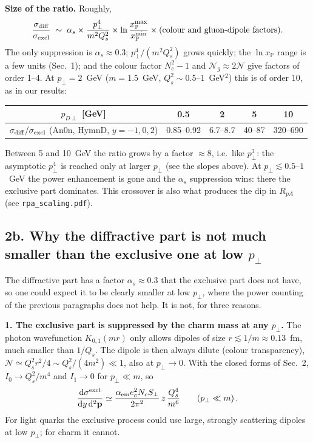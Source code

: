 \documentclass[12pt]{article}
\newcommand{\xpo}{x_{\mathbb{P}}}
\begin{document}
\textbf{Size of the ratio.} Roughly,
\[
  \frac{\sigma_{\rm diff}}{\sigma_{\rm excl}}\;\sim\;\alpha_s\times\frac{p_\perp^4}{m^2Q_s^2}
  \times\ln\frac{\xpo^{\max}}{\xpo^{\min}}\times(\text{colour and gluon-dipole factors}).
\]
The only suppression is $\alpha_s\approx0.3$; $p_\perp^4/(m^2Q_s^2)$ grows quickly; the $\ln\xpo$
range is a few units (Sec.~1); and the colour factor $N_c^2-1$ and $\mathcal{N}_g\approx2\mathcal{N}$
give factors of order 1--4. At $p_\perp=2$~GeV ($m=1.5$~GeV, $Q_s^2\sim0.5$--$1$~GeV$^2$) this is of
order 10, as in our results:
\begin{center}
\begin{tabular}{ccccc}
\toprule
$p_{D\perp}$ [GeV] & 0.5 & 2 & 5 & 10 \\
\midrule
$\sigma_{\rm diff}/\sigma_{\rm excl}$ (An0n, HymnD, $y=-1,0,2$) & 0.85--0.92 & 6.7--8.7 & 40--87 & 320--690 \\
\bottomrule
\end{tabular}
\end{center}
Between 5 and 10~GeV the ratio grows by a factor $\approx8$, i.e.\ like $p_\perp^{3}$: the asymptotic
$p_\perp^4$ is reached only at larger $p_\perp$ (see the slopes above). At $p_\perp\lesssim0.5$--$1$~GeV
the power enhancement is gone and the $\alpha_s$ suppression wins: there the exclusive part
dominates. This crossover is also what produces the dip in $R_{pA}$ (see \texttt{rpa\_scaling.pdf}).

\subsection*{2b. Why the diffractive part is not much smaller than the exclusive one at low $p_\perp$}

The diffractive part has a factor $\alpha_s\approx0.3$ that the exclusive part does not have, so one
could expect it to be clearly smaller at low $p_\perp$, where the power counting of the previous
paragraphs does not help. It is not, for three reasons.

\textbf{1. The exclusive part is suppressed by the charm mass at any $p_\perp$.} The photon
wavefunction $K_{0,1}(mr)$ only allows dipoles of size $r\lesssim1/m\approx0.13$~fm, much smaller than
$1/Q_s$. The dipole is then always dilute (colour transparency),
$\mathcal{N}\simeq Q_s^2r^2/4\sim Q_s^2/(4m^2)\ll1$, also at $p_\perp\to0$. With the closed forms of
Sec.~2, $I_0\to Q_s^2/m^4$ and $I_1\to0$ for $p_\perp\ll m$, so
\[
  \frac{\mathrm{d}\sigma^{\rm excl}}{\mathrm{d}y\,\mathrm{d}^2\mathbf{p}}
  \simeq\frac{\alpha_{\rm em}e_c^2N_cS_\perp}{2\pi^2}\,z\,\frac{Q_s^4}{m^6}\qquad(p_\perp\ll m)\,.
\]
For light quarks the exclusive process could use large, strongly scattering dipoles at low $p_\perp$;
for charm it cannot.
\end{document}
